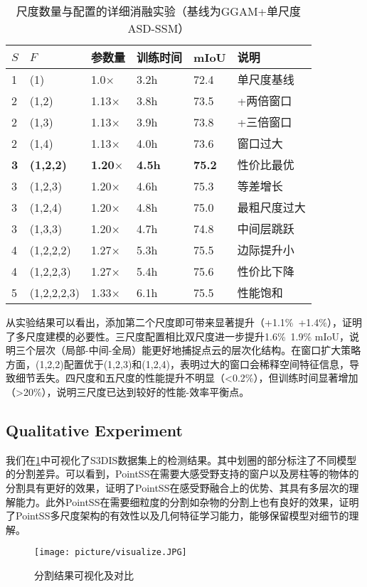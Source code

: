 \documentclass[preprint,12pt]{elsarticle}
\begin{document}
\begin{table}[htbp!]
	\centering
	\caption{尺度数量与配置的详细消融实验（基线为GGAM+单尺度ASD-SSM）}
	\label{tab:scale_number}
	\begin{tabular}{@{}llllll@{}}
		\toprule
		$S$ & $F$ & 参数量 & 训练时间 & mIoU & 说明 \\ 
		\midrule
		1 & (1) & 1.0$\times$ & 3.2h & 72.4 & 单尺度基线 \\
		\midrule
		2 & (1,2) & 1.13$\times$ & 3.8h & 73.5 & +两倍窗口 \\
		2 & (1,3) & 1.13$\times$ & 3.9h & 73.8 & +三倍窗口 \\
		2 & (1,4) & 1.13$\times$ & 4.0h & 73.6 & 窗口过大 \\
		\midrule
		\textbf{3} & \textbf{(1,2,2)} & \textbf{1.20$\times$} & \textbf{4.5h} & \textbf{75.2} & 性价比最优 \\
		3 & (1,2,3) & 1.20$\times$ & 4.6h & 75.3 & 等差增长 \\
		3 & (1,2,4) & 1.20$\times$ & 4.8h & 75.0 & 最粗尺度过大 \\
		3 & (1,3,3) & 1.20$\times$ & 4.7h & 74.8 & 中间层跳跃 \\
		\midrule
		4 & (1,2,2,2) & 1.27$\times$ & 5.3h & 75.5 & 边际提升小 \\
		4 & (1,2,2,3) & 1.27$\times$ & 5.4h & 75.6 & 性价比下降 \\
		5 & (1,2,2,2,3) & 1.33$\times$ & 6.1h & 75.5 & 性能饱和 \\
		\bottomrule
	\end{tabular}
\end{table}

从实验结果可以看出，添加第二个尺度即可带来显著提升（+1.1\%~+1.4\%），证明了多尺度建模的必要性。三尺度配置相比双尺度进一步提升1.6\%~1.9\% mIoU，说明三个层次（局部-中间-全局）能更好地捕捉点云的层次化结构。在窗口扩大策略方面，(1,2,2)配置优于(1,2,3)和(1,2,4)，表明过大的窗口会稀释空间特征信息，导致细节丢失。四尺度和五尺度的性能提升不明显（<0.2\%），但训练时间显著增加（>20\%），说明三尺度已达到较好的性能-效率平衡点。



\subsection{Qualitative Experiment}
我们在\cref{fig:vis}中可视化了S3DIS数据集上的检测结果。其中划圈的部分标注了不同模型的分割差异。可以看到，PointSS在需要大感受野支持的窗户以及房柱等的物体的分割具有更好的效果，证明了PointSS在感受野融合上的优势、其具有多层次的理解能力。此外PointSS在需要细粒度的分割如杂物的分割上也有良好的效果，证明了PointSS多尺度架构的有效性以及几何特征学习能力，能够保留模型对细节的理解。
\begin{figure}[htbp]
	\centering
	\texttt{[image: picture/visualize.JPG]}
	\caption{分割结果可视化及对比}
	\label{fig:vis}
\end{figure}
\end{document}
